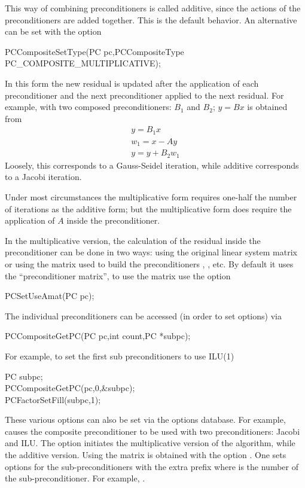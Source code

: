 This way of combining preconditioners is called additive, since
the actions of the preconditioners are added together. This is the
default behavior. An alternative can be set with the option
\begin{tabbing}
  PCCompositeSetType(PC pc,PCCompositeType PC\_COMPOSITE\_MULTIPLICATIVE);
\end{tabbing}
 
In this form the new residual is updated after the application of
each preconditioner and the next preconditioner applied to the next
residual. For example, with two composed preconditioners: $B_1$ and
$ B_2$; $ y = B x $ is obtained from
\begin{eqnarray*}
  y    = B_1 x \\
  w_1  = x - A y \\
  y    = y + B_2 w_1
\end{eqnarray*}
Loosely, this corresponds to a Gauss-Seidel iteration, while
additive corresponds to a Jacobi iteration.

Under most circumstances the multiplicative form requires one-half the number of
iterations as the additive form; but the multiplicative form does require
the application of $ A $ inside the preconditioner.

In the multiplicative version, the calculation of the residual inside the
preconditioner can be done in two ways: using the original linear system matrix
or using the matrix used to build the preconditioners , , etc.
By default it uses the ``preconditioner matrix'', to use the  matrix use the
option
\begin{tabbing}
  PCSetUseAmat(PC pc);
\end{tabbing}

The individual
preconditioners can be accessed (in order to set options) via
\begin{tabbing}
  PCCompositeGetPC(PC pc,int count,PC *subpc);
\end{tabbing}
For example, to set the first sub preconditioners to use ILU(1)
\begin{tabbing}
   PC subpc;\\
  PCCompositeGetPC(pc,0,\&subpc);\\
  PCFactorSetFill(subpc,1);
\end{tabbing}

These various options can also be set via the options database. For example,
    
 causes the composite preconditioner to be used with
two preconditioners: Jacobi and ILU. The option  
 initiates the multiplicative version of the algorithm,
while   the additive version. Using the 
matrix is obtained with the option .
 One sets options for the sub-preconditioners with the
extra prefix  where  is the number of the sub-preconditioner.
For example,  .


